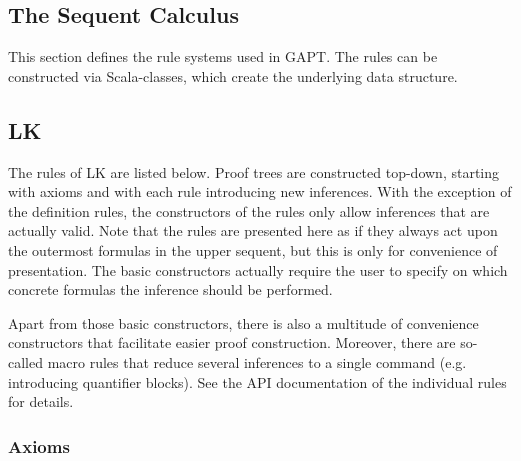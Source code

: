 \documentclass[a4paper,11pt]{article}
\begin{document}
%
%
%

\vfill
\pagebreak
\begin{appendix}

\section{The Sequent Calculus}\label{app:sequent_calculus}

This section defines the rule systems used in GAPT. The rules can be constructed
via Scala-classes, which create the underlying data structure.

\subsection{LK}


The rules of LK are listed below. Proof trees are constructed top-down, starting with axioms and with each rule introducing new inferences. With the exception of the definition rules, the constructors of the rules only allow inferences that are actually valid. Note that the rules are presented here as if they always act upon the outermost formulas in the upper sequent, but this is only for convenience of presentation. The basic constructors actually require the user to specify on which concrete formulas the inference should be performed.

Apart from those basic constructors, there is also a multitude of convenience constructors that facilitate easier proof construction. Moreover, there are so-called macro rules that reduce several inferences to a single command (e.g. introducing quantifier blocks). See the API documentation of the individual rules for details. 

\subsubsection*{Axioms}


\end{appendix}
\end{document}
